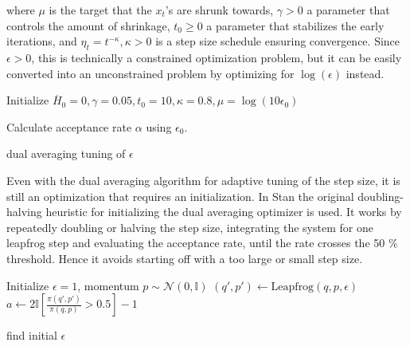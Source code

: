 \documentclass[12pt]{report}
\begin{document}
where $\mu$ is the target that the $x_t$'s are shrunk towards, $\gamma > 0$ a
parameter that controls the amount of shrinkage, $t_0 \ge 0$ a parameter that
stabilizes the early iterations, and $\eta_t = t^{-\kappa},\kappa>0$ is a
step size schedule ensuring convergence. Since $\epsilon>0$, this is technically
a constrained optimization problem, but it can be easily converted into an
unconstrained problem by optimizing for $\log(\epsilon)$ instead. 

\begin{algorithm}

Initialize $\overline{H}_0 = 0, \gamma = 0.05, t_0 = 10 ,\kappa = 0.8 , \mu = \log(10\epsilon_0)$ \;
	
	Calculate acceptance rate $\alpha$ using $\epsilon_0$. \;

\caption{dual averaging tuning of $\epsilon$ }
\end{algorithm}

Even with the dual averaging algorithm for adaptive tuning of the step size, it is still an optimization that requires an initialization. In Stan the original doubling-halving heuristic for initializing the dual averaging optimizer is used. It works by repeatedly doubling or halving the step size, integrating the system for one leapfrog step and evaluating the acceptance rate, until the rate crosses the 50 \% threshold. Hence it avoids starting off with a too large or small step size. 
\begin{algorithm}
Initialize $\epsilon = 1$, momentum $p \sim \mathcal{N}(0,\mathbb{I}) $ \;
$(q',p') \leftarrow \text{Leapfrog}(q,p,\epsilon) $ \;
$a \leftarrow 2 \mathbb{I}[ \frac{\pi(q',p')}{\pi(q,p)} > 0.5 ] -1 $\;
\KwRet{$\epsilon$}
\caption{find initial $\epsilon$} 
\end{algorithm}
\end{document}
